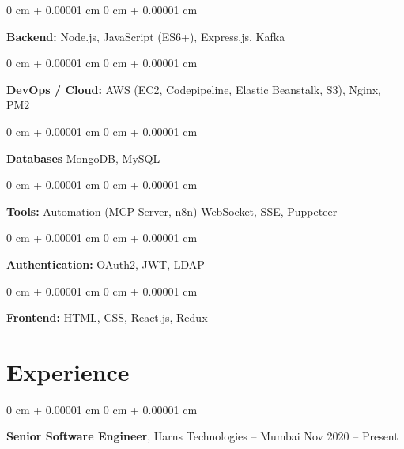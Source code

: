 \documentclass[10pt, letterpaper]{article}
\newenvironment{onecolentry}{
    \begin{adjustwidth}{
        0 cm + 0.00001 cm
    }{
        0 cm + 0.00001 cm
    }
}{
    \end{adjustwidth}
} %
\newenvironment{twocolentry}[2][]{
    \onecolentry
    \def\secondColumn{#2}
    \setcolumnwidth{\fill, 4.5 cm}
    \begin{paracol}{2}
}{
    \switchcolumn \raggedleft \secondColumn
    \end{paracol}
    \endonecolentry
} %
\begin{document}
        
        \begin{onecolentry}
            \textbf{Backend:} Node.js, JavaScript (ES6+), Express.js, Kafka 
        \end{onecolentry}

        \vspace{0.2 cm}

                \begin{onecolentry}
            \textbf{DevOps / Cloud:}  AWS (EC2, Codepipeline, Elastic Beanstalk, S3), Nginx, PM2
        \end{onecolentry}

        \vspace{0.2 cm}


        \begin{onecolentry}
            \textbf{Databases} MongoDB, MySQL
        \end{onecolentry}
\vspace{0.2 cm}
\begin{onecolentry}
            \textbf{Tools:} Automation (MCP Server, n8n) WebSocket, SSE, Puppeteer
        \end{onecolentry}
        \vspace{0.2 cm}
                \begin{onecolentry}
            \textbf{Authentication:} OAuth2, JWT, LDAP
        \end{onecolentry}
\vspace{0.2 cm}
        \begin{onecolentry}
            \textbf{Frontend:} HTML, CSS, React.js, Redux
        \end{onecolentry}
\vspace{0.2 cm}

   
    \section{Experience}
   
        \begin{twocolentry}{
            Nov 2020 – Present
        }
            \textbf{Senior Software Engineer}, Harns Technologies -- Mumbai\end{twocolentry}
\end{document}
